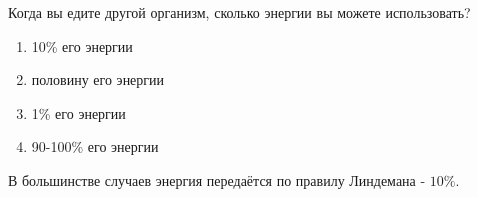 
Когда вы едите другой организм, сколько энергии вы можете использовать?

\begin{enumerate}
    \item 10\% его энергии
    \item половину его энергии
    \item 1\% его энергии
    \item 90-100\% его энергии
\end{enumerate}

\explanationSection

В большинстве случаев энергия передаётся по правилу Линдемана - $10\%$.

